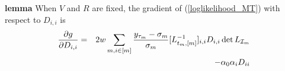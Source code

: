 
\noindent
\textbf{lemma} When $V$ and $R$ are fixed, the gradient of (\ref{loglikelihood_MT}) with respect to $D_{i,i}$ is
\begin{eqnarray}
\label{MT_Dgradient}
\frac{\partial g}{\partial D_{i,i}} & = & 2 w \sum_{m, i \in [m]} \frac{y_{\tau_m} - \sigma_m}{\sigma_m} [L^{-1}_{t_m,[m]}]_{i,i} D_{i,i} \det L_{\mathcal{I}_m} \nonumber \\
& & - \alpha_0 \alpha_i D_{ii} 
\end{eqnarray}


